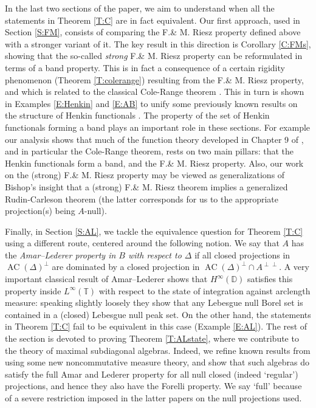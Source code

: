 \documentclass[10pt]{amsart}
\newcommand{\bD}{{\mathbb{D}}}
\newcommand{\bT}{{\mathbb{T}}}
\newcommand{\AC}{\operatorname{AC}}
\theoremstyle{definition}
\begin{document}
In the last two sections of the paper, we aim to understand when all the statements in Theorem 
\ref{T:C} are in fact equivalent. Our first approach, used in Section \ref{S:FM}, consists of comparing the F.\& M. Riesz property defined above with a stronger variant of it. The key result in this direction is Corollary \ref{C:FMs}, showing that the so-called \emph{strong} F.\& M. Riesz property can be reformulated in terms of a band property. 
This is in fact a consequence of a certain rigidity phenomenon (Theorem \ref{T:colerange}) resulting from the F.\& M. Riesz property, 
and which is related to the classical Cole-Range theorem \cite[Theorem 9.6.1]{rudin2008}.
This in turn  is  shown in Examples \ref{E:Henkin} and \ref{E:AB} to unify some previously known results on the structure of Henkin functionals \cite{CD2016duality,CH2025,CT2023Henkin}.
The property of the set of Henkin functionals forming a band plays an important role in these sections.  For example our analysis shows that much of 
the function theory developed  in Chapter 9 of \cite{rudin2008}, and in particular the Cole-Range theorem, rests on two main  pillars: that 
the Henkin functionals form a
band, and the F.\& M. Riesz property.  Also,  
our work  on the (strong) F.\& M.  Riesz property may be viewed as generalizations of Bishop's insight \cite{bishop1962} that a (strong) F.\& M.  Riesz theorem implies a generalized Rudin-Carleson theorem (the latter corresponds for us  to the appropriate projection(s) being $A$-null).  

Finally, in Section \ref{S:AL}, we tackle the equivalence question for Theorem 
\ref{T:C} using a different route, centered around the following notion. We say that $A$ has the \emph{Amar--Lederer property in $B$ with respect to 
$\Delta$} if all closed projections in $\AC(\Delta)^\perp$ are dominated by a closed projection in $\AC(\Delta)^\perp\cap A^{\perp\perp}$.  A very  important 
 classical result of Amar--Lederer \cite{AL1971} shows that $H^\infty(\bD)$ satisfies this property inside $L^\infty(\bT)$ with respect to the state of integration against arclength measure: speaking slightly loosely they show that any  Lebesgue null Borel set is contained in a (closed) Lebesgue null peak set. 
On the other hand, the statements in Theorem 
\ref{T:C}
 fail to be equivalent in this case (Example \ref{E:AL}). The rest of the section is devoted to proving Theorem \ref{T:ALstate}, where we contribute to the theory of maximal subdiagonal algebras. Indeed, we refine known results from \cite{ueda2009,BL2018} using some new noncommutative measure theory, 
 and show that such algebras do satisfy the full Amar and Lederer property for all null closed (indeed `regular') projections, and hence they also have the Forelli property.   
 We say `full' because of a severe restriction imposed  in the latter papers on the null projections used. 
\end{document}
